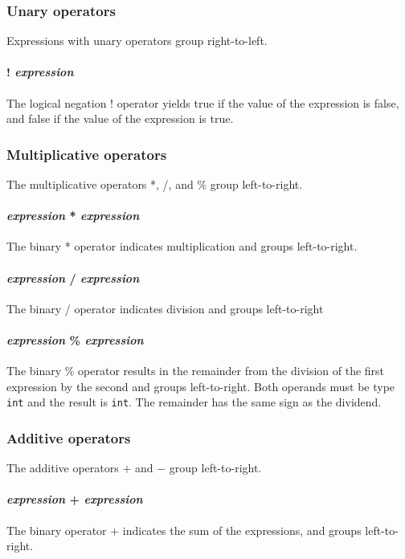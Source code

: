 \subsubsection{Unary operators}
Expressions with unary operators group right-to-left.

\paragraph{! \textit{expression}}
The logical negation ! operator yields true if the value of the expression is false, and false if the value of the expression is true. 

\subsubsection{Multiplicative operators}
The multiplicative operators *, /, and \% group left-to-right.

\paragraph{\textit{expression} * \textit{expression}}
The binary * operator indicates multiplication and groups left-to-right.

\paragraph{\textit{expression} / \textit{expression}}
The binary / operator indicates division and groups left-to-right 

\paragraph{\textit{expression} \% \textit{expression}}
The  binary \% operator results in the remainder from the division of the first expression by the second and groups left-to-right. Both operands must be type \texttt{int} and the result is \texttt{int}. The remainder has the same sign as the dividend.
\\
\subsubsection{Additive operators}
The additive operators $+$ and $-$ group left-to-right.

\paragraph{\textit{expression} + \textit{expression}}
The binary  operator + indicates the sum of the expressions, and groups left-to-right.

